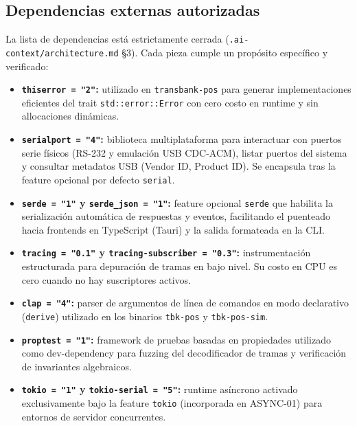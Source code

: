 \documentclass{../../plantilla/raysac-informe}
\begin{document}
\subsection{Dependencias externas autorizadas}
La lista de dependencias está estrictamente cerrada (\texttt{.ai-context/architecture.md} §3). Cada pieza
cumple un propósito específico y verificado:
\begin{itemize}
  \item \textbf{\texttt{thiserror = "2"}:} utilizado en \texttt{transbank-pos} para generar implementaciones
    eficientes del trait \texttt{std::error::Error} con cero costo en runtime y sin allocaciones dinámicas.
  \item \textbf{\texttt{serialport = "4"}:} biblioteca multiplataforma para interactuar con puertos serie
    físicos (RS-232 y emulación USB CDC-ACM), listar puertos del sistema y consultar metadatos USB (Vendor ID,
    Product ID). Se encapsula tras la feature opcional por defecto \texttt{serial}.
  \item \textbf{\texttt{serde = "1"} y \texttt{serde\_json = "1"}:} feature opcional \texttt{serde} que habilita
    la serialización automática de respuestas y eventos, facilitando el puenteado hacia frontends en TypeScript
    (Tauri) y la salida formateada en la CLI.
  \item \textbf{\texttt{tracing = "0.1"} y \texttt{tracing-subscriber = "0.3"}:} instrumentación estructurada
    para depuración de tramas en bajo nivel. Su costo en CPU es cero cuando no hay suscriptores activos.
  \item \textbf{\texttt{clap = "4"}:} parser de argumentos de línea de comandos en modo declarativo (\texttt{derive})
    utilizado en los binarios \texttt{tbk-pos} y \texttt{tbk-pos-sim}.
  \item \textbf{\texttt{proptest = "1"}:} framework de pruebas basadas en propiedades utilizado como dev-dependency
    para fuzzing del decodificador de tramas y verificación de invariantes algebraicos.
  \item \textbf{\texttt{tokio = "1"} y \texttt{tokio-serial = "5"}:} runtime asíncrono activado exclusivamente
    bajo la feature \texttt{tokio} (incorporada en ASYNC-01) para entornos de servidor concurrentes.
\end{itemize}
\end{document}

